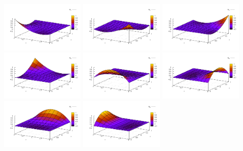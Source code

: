 \begin{center}
\includegraphics[width=4cm]{images/basis_Q2_2D/N1}
\includegraphics[width=4cm]{images/basis_Q2_2D/N2}
\includegraphics[width=4cm]{images/basis_Q2_2D/N3}\\
\includegraphics[width=4cm]{images/basis_Q2_2D/N4}
\includegraphics[width=4cm]{images/basis_Q2_2D/N5}
\includegraphics[width=4cm]{images/basis_Q2_2D/N6}\\
\includegraphics[width=4cm]{images/basis_Q2_2D/N7}
\includegraphics[width=4cm]{images/basis_Q2_2D/N8}

\end{center}
